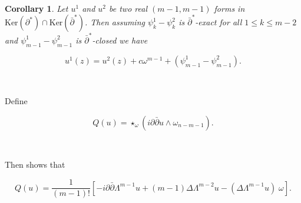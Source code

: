\documentclass[10pt,a4paper]{amsart}
\newcommand{\sbpartial}{\bar{\partial}^*}
\newcommand{\spartial}{\partial^*}
\newcommand{\bpartial}{\bar{\partial}}
\newcommand{\pbp}{\partial \bar{\partial}}
\newcommand{\Ker}{\mbox{Ker}}
\newtheorem{corollary}[theorem]{Corollary}
\numberwithin{equation}{section}
\begin{document}
\








\begin{corollary}\label{lemma3}
    Let $u^1$ and $u^2$ be two real $(m-1,m-1)$ forms in $\Ker (\spartial) \cap \Ker( \bar{\partial}^*)$. Then assuming $\psi^1_{k} -\psi^2_{k}$ is $\sbpartial$-exact for all $1 \leq k \leq m-2$ and $\psi^1_{m-1} -\psi^2_{m-1}$ is $\sbpartial$-closed 
    we have 
    
    $$u^1(z) = u^2(z) + c \omega^{m-1} + (\psi^1_{m-1} -\psi^2_{m-1}).$$
    
\end{corollary}


\ 



Define

\begin{equation}
Q(u) = \star_{\omega}(i \pbp u \wedge \omega_{n-m-1}).
\end{equation}

\

Then \cite[Cor.~3.4]{DP25} shows that

\begin{equation}\label{defineQ}
        Q(u)= \frac{1}{(m-1)!}\left[-i \pbp \Lambda^{m-1} u + (m-1) \Delta \Lambda^{m-2} u - (\Delta \Lambda^{m-1} u) \;\omega\right].
\end{equation}
\end{document}
